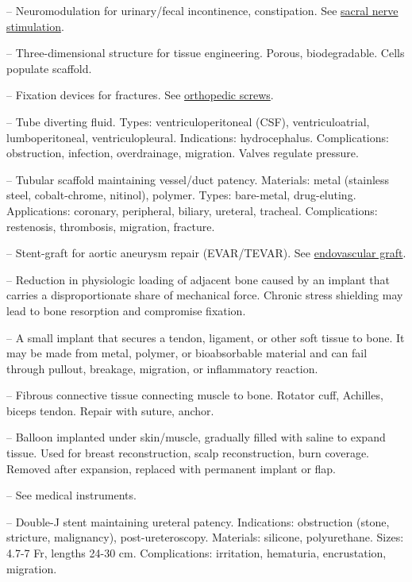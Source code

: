-- Neuromodulation for urinary/fecal incontinence, constipation. See \hyperlink{Sacral Nerve Stimulation}{sacral nerve stimulation}.

-- Three-dimensional structure for tissue engineering. Porous, biodegradable. Cells populate scaffold.

-- Fixation devices for fractures. See \hyperlink{Orthopedic Screws}{orthopedic screws}.

-- Tube diverting fluid. Types: ventriculoperitoneal (CSF), ventriculoatrial, lumboperitoneal, ventriculopleural. Indications: hydrocephalus. Complications: obstruction, infection, overdrainage, migration. Valves regulate pressure.

-- Tubular scaffold maintaining vessel/duct patency. Materials: metal (stainless steel, cobalt-chrome, nitinol), polymer. Types: bare-metal, drug-eluting. Applications: coronary, peripheral, biliary, ureteral, tracheal. Complications: restenosis, thrombosis, migration, fracture.



-- Stent-graft for aortic aneurysm repair (EVAR/TEVAR). See \hyperlink{Endovascular Graft}{endovascular graft}.

-- Reduction in physiologic loading of adjacent bone caused by an implant that carries a disproportionate share of mechanical force. Chronic stress shielding may lead to bone resorption and compromise fixation.


-- A small implant that secures a tendon, ligament, or other soft tissue to bone. It may be made from metal, polymer, or bioabsorbable material and can fail through pullout, breakage, migration, or inflammatory reaction.

-- Fibrous connective tissue connecting muscle to bone. Rotator cuff, Achilles, biceps tendon. Repair with suture, anchor.

-- Balloon implanted under skin/muscle, gradually filled with saline to expand tissue. Used for breast reconstruction, scalp reconstruction, burn coverage. Removed after expansion, replaced with permanent implant or flap.

-- See medical instruments.

-- Double-J stent maintaining ureteral patency. Indications: obstruction (stone, stricture, malignancy), post-ureteroscopy. Materials: silicone, polyurethane. Sizes: 4.7-7 Fr, lengths 24-30 cm. Complications: irritation, hematuria, encrustation, migration.

